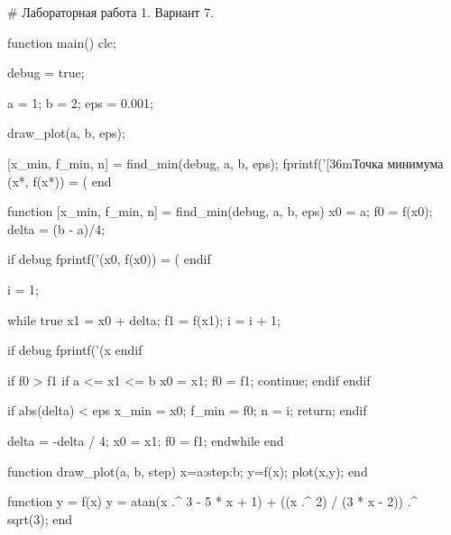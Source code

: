 # Лабораторная работа 1. Вариант 7.

function main()
  clc;

  debug = true;

  a = 1;
  b = 2;
  eps = 0.001;

  draw_plot(a, b, eps);

  [x_min, f_min, n] = find_min(debug, a, b, eps);
  fprintf('\n{}[36mТочка минимума (x*, f(x*)) = (%
end

function [x_min, f_min, n] = find_min(debug, a, b, eps)
  x0 = a;
  f0 = f(x0);
  delta = (b - a)/4;

  if debug
    fprintf('(x0, f(x0)) = (%
  endif

  i = 1;

  while true
    x1 = x0 + delta;
    f1 = f(x1);
    i = i + 1;

    if debug
      fprintf('(x%
    endif

    if f0 > f1
      if a <= x1 <= b
        x0 = x1;
        f0 = f1;
        continue;
      endif
    endif

    if abs(delta) < eps
      x_min = x0;
      f_min = f0;
      n = i;
      return;
    endif

    delta = -delta / 4;
    x0 = x1;
    f0 = f1;
  endwhile
end

function draw_plot(a, b, step)
  x=a:step:b;
  y=f(x);
  plot(x,y);
end

function y = f(x)
  y = atan(x .^ 3 - 5 * x + 1) + ((x .^ 2) / (3 * x - 2)) .^ sqrt(3);
end
